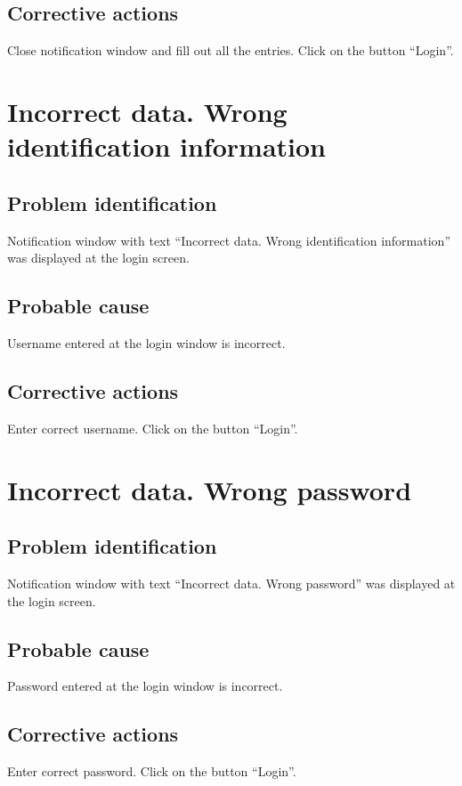 \subsection{Corrective actions}
Close notification window and fill out all the entries. Click on the button
``Login''.


\section{Incorrect data. Wrong identification information}

\subsection{Problem identification}
Notification window with text ``Incorrect data. Wrong identification
information'' was displayed at the login screen.

\subsection{Probable cause}
Username entered at the login window is incorrect.

\subsection{Corrective actions}
Enter correct username. Click on the button ``Login''.


\section{Incorrect data. Wrong password}

\subsection{Problem identification}
Notification window with text ``Incorrect data. Wrong password''
was displayed at the login screen.

\subsection{Probable cause}
Password entered at the login window is incorrect.

\subsection{Corrective actions}
Enter correct password. Click on the button ``Login''.


